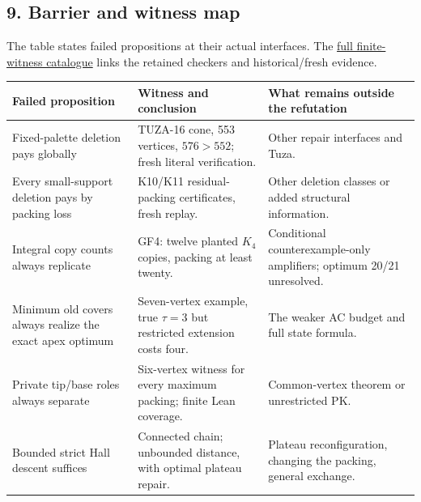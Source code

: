 \documentclass[11pt,a4paper]{article}
\begin{document}
\subsection{9. Barrier and witness map}\label{barrier-and-witness-map}

The table states failed propositions at their actual interfaces. The \href{https://github.com/pappa211/ai-math-experiments/blob/main/verification/tuza-16-19/WITNESSES.md}{full finite-witness catalogue} links the retained checkers and historical/fresh evidence.

{\def\LTcaptype{none} %
\begin{longtable}[]{@{}
  >{\raggedright\arraybackslash}p{}
  >{\raggedright\arraybackslash}p{}
  >{\raggedright\arraybackslash}p{}@{}}
\toprule\noalign{}
\begin{minipage}[b]{\linewidth}\raggedright
Failed proposition
\end{minipage} & \begin{minipage}[b]{\linewidth}\raggedright
Witness and conclusion
\end{minipage} & \begin{minipage}[b]{\linewidth}\raggedright
What remains outside the refutation
\end{minipage} \\
\midrule\noalign{}
\endhead
\bottomrule\noalign{}
\endlastfoot
Fixed-palette deletion pays globally & TUZA-16 cone, 553 vertices, \(576>552\); fresh literal verification. & Other repair interfaces and Tuza. \\
Every small-support deletion pays by packing loss & 66 K10/K11 residual-packing certificates, fresh replay. & Other deletion classes or added structural information. \\
Integral copy counts always replicate & GF4: twelve planted \(K_4\) copies, packing at least twenty. & Conditional counterexample-only amplifiers; optimum 20/21 unresolved. \\
Minimum old covers always realize the exact apex optimum & Seven-vertex example, true \(\tau=3\) but restricted extension costs four. & The weaker AC budget and full state formula. \\
Private tip/base roles always separate & Six-vertex witness for every maximum packing; finite Lean coverage. & Common-vertex theorem or unrestricted PK. \\
Bounded strict Hall descent suffices & Connected chain; unbounded distance, with optimal plateau repair. & Plateau reconfiguration, changing the packing, general exchange. \\

\end{longtable}}
\end{document}
